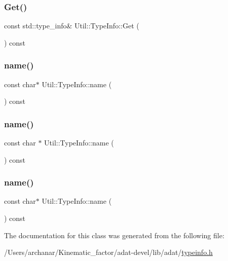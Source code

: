\subsubsection{\texorpdfstring{Get()}{Get()}\hspace{0.1cm}{\footnotesize\ttfamily [3/3]}}
{\footnotesize\ttfamily const std\+::type\+\_\+info\& Util\+::\+Type\+Info\+::\+Get (\begin{DoxyParamCaption}{ }\end{DoxyParamCaption}) const}

\mbox{\label{classUtil_1_1TypeInfo_ae6ca4a05f56329034b44fff495170737}} 
\subsubsection{\texorpdfstring{name()}{name()}\hspace{0.1cm}{\footnotesize\ttfamily [1/3]}}
{\footnotesize\ttfamily const char$\ast$ Util\+::\+Type\+Info\+::name (\begin{DoxyParamCaption}{ }\end{DoxyParamCaption}) const}

\mbox{\label{classUtil_1_1TypeInfo_a0b8817efd5836d63f3d2ac808858dadb}} 
\subsubsection{\texorpdfstring{name()}{name()}\hspace{0.1cm}{\footnotesize\ttfamily [2/3]}}
{\footnotesize\ttfamily const char $\ast$ Util\+::\+Type\+Info\+::name (\begin{DoxyParamCaption}{ }\end{DoxyParamCaption}) const\hspace{0.3cm}{\ttfamily [inline]}}

\mbox{\label{classUtil_1_1TypeInfo_ae6ca4a05f56329034b44fff495170737}} 
\subsubsection{\texorpdfstring{name()}{name()}\hspace{0.1cm}{\footnotesize\ttfamily [3/3]}}
{\footnotesize\ttfamily const char$\ast$ Util\+::\+Type\+Info\+::name (\begin{DoxyParamCaption}{ }\end{DoxyParamCaption}) const}



The documentation for this class was generated from the following file\+:\begin{DoxyCompactItemize}
\item 
/\+Users/archanar/\+Kinematic\+\_\+factor/adat-\/devel/lib/adat/\mbox{\hyperlink{adat-devel_2lib_2adat_2typeinfo_8h}{typeinfo.\+h}}\end{DoxyCompactItemize}
